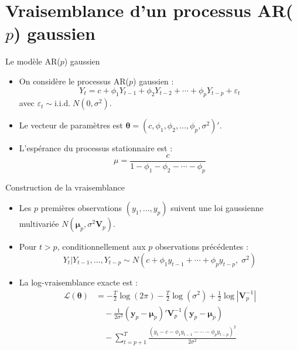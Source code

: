 \documentclass[11pt,aspectratio=169]{beamer}
\begin{document}
\section{Vraisemblance d'un processus AR($p$) gaussien}

\begin{frame}{Le modèle AR($p$) gaussien}

\begin{itemize}

\item On considère le processus AR($p$) gaussien :
  \[
  Y_t = c + \phi_1 Y_{t-1} + \phi_2 Y_{t-2} + \cdots + \phi_p Y_{t-p} + \varepsilon_t
  \]
  avec $\varepsilon_t \sim \text{i.i.d.}\; N(0, \sigma^2)$.\newline

\item Le vecteur de paramètres est $\bm{\theta} = (c, \phi_1, \phi_2, \ldots, \phi_p, \sigma^2)'$.\newline

\item L'espérance du processus stationnaire est :
  \[
  \mu = \frac{c}{1 - \phi_1 - \phi_2 - \cdots - \phi_p}
  \]

\end{itemize}

\end{frame}

\begin{frame}{Construction de la vraisemblance}

\begin{itemize}

\item Les $p$ premières observations $(y_1, \ldots, y_p)$ suivent une loi gaussienne multivariée $N(\bm{\mu}_p, \sigma^2 \mathbf{V}_p)$.\newline

\item Pour $t > p$, conditionnellement aux $p$ observations précédentes :
  \[
  Y_t | Y_{t-1}, \ldots, Y_{t-p} \sim N(c + \phi_1 y_{t-1} + \cdots + \phi_p y_{t-p}, \; \sigma^2)
  \]\newline

\item La log-vraisemblance exacte est :
  \begin{align*}
  \mathcal{L}(\bm{\theta}) &= -\frac{T}{2}\log(2\pi) - \frac{T}{2}\log(\sigma^2) + \frac{1}{2}\log|\mathbf{V}_p^{-1}| \\
  &\quad - \frac{1}{2\sigma^2}(\mathbf{y}_p - \bm{\mu}_p)'\mathbf{V}_p^{-1}(\mathbf{y}_p - \bm{\mu}_p) \\
  &\quad - \sum_{t=p+1}^{T} \frac{(y_t - c - \phi_1 y_{t-1} - \cdots - \phi_p y_{t-p})^2}{2\sigma^2}
  \end{align*}

\end{itemize}

\end{frame}
\end{document}
